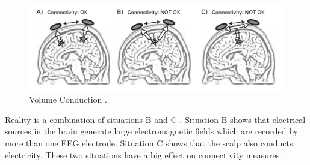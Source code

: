 \begin{figure}[!htb]
\caption{Volume Conduction \cite{cohen2014analyzing}.}
\label{conduction}
    \centering
    \includegraphics[width=\textwidth]{fig/conduction}
\end{figure}

Reality is a combination of situations B and C \cite{brunner2016volume}. Situation B shows that electrical sources in the brain generate large electromagnetic fields which are recorded by more than one EEG electrode. Situation C shows that the scalp also conducts electricity. These two situations have a big effect on connectivity measures. 
